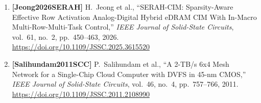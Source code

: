 \begin{enumerate}
    \item \textbf{[Jeong2026SERAH]} H.~Jeong et al., ``SERAH-CIM: Sparsity-Aware Effective Row Activation Analog-Digital Hybrid eDRAM CIM With In-Macro Multi-Row-Multi-Task Control,'' \emph{IEEE Journal of Solid-State Circuits}, vol.~61, no.~2, pp.~450--463, 2026. \url{https://doi.org/10.1109/JSSC.2025.3615520}
    \item \textbf{[Salihundam2011SCC]} P.~Salihundam et al., ``A 2-TB/s 6x4 Mesh Network for a Single-Chip Cloud Computer with DVFS in 45-nm CMOS,'' \emph{IEEE Journal of Solid-State Circuits}, vol.~46, no.~4, pp.~757--766, 2011. \url{https://doi.org/10.1109/JSSC.2011.2108990}
\end{enumerate}
